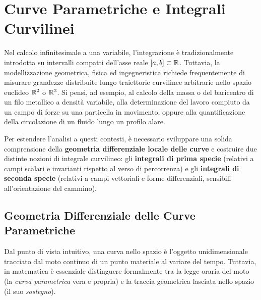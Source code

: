 
\chapter{Curve Parametriche e Integrali Curvilinei}
\label{chap:curve_e_integrali_curvilinei}

Nel calcolo infinitesimale a una variabile, l'integrazione è tradizionalmente introdotta su intervalli compatti dell'asse reale $[a,b] \subset \mathbb{R}$. Tuttavia, la modellizzazione geometrica, fisica ed ingegneristica richiede frequentemente di misurare grandezze distribuite lungo traiettorie curvilinee arbitrarie nello spazio euclideo $\mathbb{R}^2$ o $\mathbb{R}^3$. Si pensi, ad esempio, al calcolo della massa o del baricentro di un filo metallico a densità variabile, alla determinazione del lavoro compiuto da un campo di forze su una particella in movimento, oppure alla quantificazione della circolazione di un fluido lungo un profilo alare.

Per estendere l'analisi a questi contesti, è necessario sviluppare una solida comprensione della \textbf{geometria differenziale locale delle curve} e costruire due distinte nozioni di integrale curvilineo: gli \textbf{integrali di prima specie} (relativi a campi scalari e invarianti rispetto al verso di percorrenza) e gli \textbf{integrali di seconda specie} (relativi a campi vettoriali e forme differenziali, sensibili all'orientazione del cammino).

\section{Geometria Differenziale delle Curve Parametriche}

Dal punto di vista intuitivo, una curva nello spazio è l'oggetto unidimensionale tracciato dal moto continuo di un punto materiale al variare del tempo. Tuttavia, in matematica è essenziale distinguere formalmente tra la legge oraria del moto (la \emph{curva parametrica} vera e propria) e la traccia geometrica lasciata nello spazio (il suo \emph{sostegno}).

